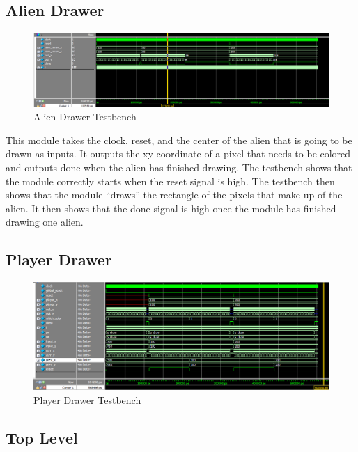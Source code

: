 \documentclass[11pt, titlepage]{article}
\begin{document}
        \subsection{Alien Drawer}
            \begin{figure}[H]
                \centering
                \includegraphics[scale = 0.49]{Images/Testbench Alien Drawer.png}
                \caption{Alien Drawer Testbench}
            \end{figure}
            This module takes the clock, reset, and the center of the alien that is going to be drawn as inputs. It outputs the xy coordinate of a pixel that needs to be colored and outputs done when the alien has finished drawing. The testbench shows that the module correctly starts when the reset signal is high. The testbench then shows that the module ``draws'' the rectangle of the pixels that make up of the alien. It then shows that the done signal is high once the module has finished drawing one alien.
        \subsection{Player Drawer}
            \begin{figure}[H]
                \centering
                \includegraphics[scale = 0.53]{Images/Testbench Player Drawer.png}
                \caption{Player Drawer Testbench}
            \end{figure}

        \subsection{Top Level}
\end{document}
